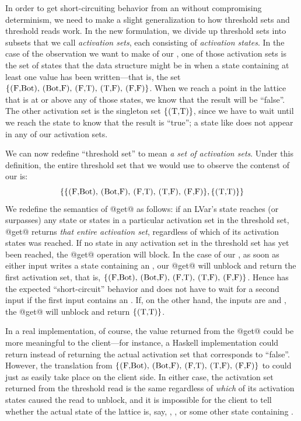In order to get short-circuiting behavior from an  without
compromising determinism, we need to make a slight generalization to
how threshold sets and threshold reads work.  In the new formulation,
we divide up threshold sets into subsets that we call \emph{activation
  sets}, each consisting of \emph{activation states}.  In the case of
the observation we want to make of our , one of those
activation sets is the set of states that the data structure might be
in when a state containing at least one  value has been
written---that is, the set $\setof{ \textrm{\il{(F,Bot)},
    \il{(Bot,F)}, \il{(F,T)}, \il{(T,F)}, \il{(F,F)}} }$.  When we
reach a point in the lattice that is at or above any of those states,
we know that the result will be ``false''.  The other activation set
is the singleton set $\{ \textrm{\il{(T,T)}} \}$, since we have to
wait until we reach the state  to know that the result is
``true''; a state like  does not appear in any of our
activation sets.

We can now redefine ``threshold set'' to mean \emph{a set of
  activation sets}.  Under this definition, the entire threshold set
that we would use to observe the contenst of our  is:
\[
\{ 
\{ \textrm{\il{(F,Bot)}, \il{(Bot,F)}, \il{(F,T)}, \il{(T,F)}, \il{(F,F)}} \},
\{ \textrm{\il{(T,T)}} \}
\}
\]
We redefine the semantics of @get@ as follows: if an LVar's state
reaches (or surpasses) any state or states in a particular activation
set in the threshold set, @get@ returns \emph{that entire activation
  set}, regardless of which of its activation states was reached. If
no state in any activation set in the threshold set has yet been
reached, the @get@ operation will block.  In the case of our
, as soon as either input writes a state containing an
, our @get@ will unblock and return the first activation set,
that is, $\{ \textrm{\il{(F,Bot)}, \il{(Bot,F)}, \il{(F,T)},
  \il{(T,F)}, \il{(F,F)}} \}$.  Hence  has the expected
``short-circuit'' behavior and does not have to wait for a second
input if the first input contains an .  If, on the other hand,
the inputs are  and , the @get@ will unblock
and return $\{ \textrm{\il{(T,T)}} \}$.

In a real implementation, of course, the value returned from the @get@
could be more meaningful to the client---for instance, a Haskell
implementation could return  instead of returning the actual
activation set that corresponds to ``false''.  However, the
translation from $\{ \textrm{\il{(F,Bot)}, \il{(Bot,F)}, \il{(F,T)},
  \il{(T,F)}, \il{(F,F)}} \}$ to  could just as easily take
place on the client side.  In either case, the activation set returned
from the threshold read is the same regardless of \emph{which} of its
activation states caused the read to unblock, and it is impossible for
the client to tell whether the actual state of the lattice is, say,
, , or some other state containing .

